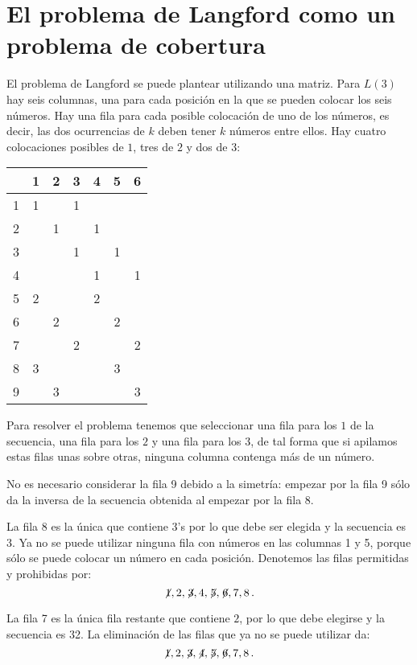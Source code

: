\section{El problema de Langford como un problema de cobertura}\label{s.langford-covering}

El problema de Langford se puede plantear utilizando una matriz. Para $L(3)$ hay seis columnas, una para cada posición en la que se pueden colocar los seis números. Hay una fila para cada posible colocación de uno de los números, es decir, las dos ocurrencias de $k$ deben tener $k$ números entre ellos. Hay cuatro colocaciones posibles de $1$, tres de $2$ y dos de $3$:

\begin{center}
\addtolength{\tabcolsep}{4pt}
\begin{tabular}{|c||c|c|c|c|c|c|}
\hline
&1&2&3&4&5&6\\\hline\hline
1&1&&1&&&\\\hline
2&&1&&1&&\\\hline
3&&&1&&1&\\\hline
4&&&&1&&1\\\hline
5&2&&&2&&\\\hline
6&&2&&&2&\\\hline
7&&&2&&&2\\\hline
8&3&&&&3&\\\hline
9&&3&&&&3\\\hline
\end{tabular}
\end{center}
Para resolver el problema tenemos que seleccionar una fila para los $1$ de la secuencia, una fila para los $2$ y una fila para los $3$, de tal forma que si apilamos estas filas unas sobre otras, ninguna columna contenga más de un número.

No es necesario considerar la fila 9 debido a la simetría: empezar por la fila 9 sólo da la inversa de la secuencia obtenida al empezar por la fila 8.

La fila 8 es la única que contiene $3$'s por lo que debe ser elegida y la secuencia es 3\textvisiblespace \textvisiblespace {}\textvisiblespace. Ya no se puede utilizar ninguna fila con números en las columnas 1 y 5, porque sólo se puede colocar un número en cada posición. Denotemos las filas permitidas y prohibidas por:
\[\not\! 1,2,\not\! 3,4,\not\! 5, \not\! 6, 7, 8\,.\]

La fila 7 es la única fila restante que contiene $2$, por lo que debe elegirse y la secuencia es 32. La eliminación de las filas que ya no se puede utilizar da:
\[\not\! 1,2,\not\! 3,\not\! 4,\not\! 5, \not\! 6, 7, 8\,.\]

